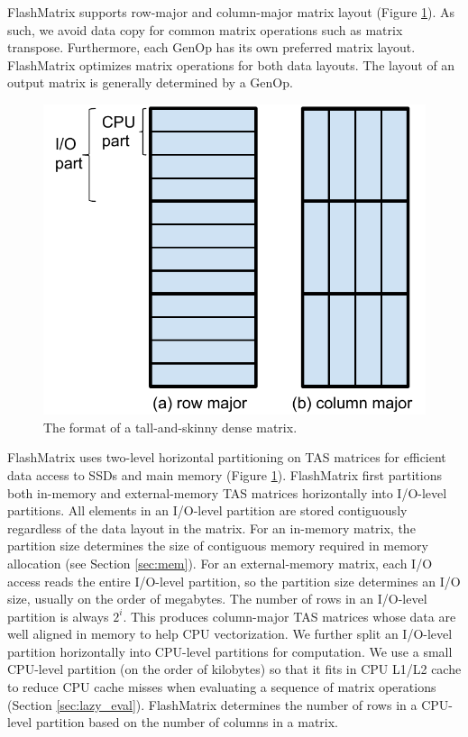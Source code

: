 FlashMatrix supports row-major and column-major matrix layout (Figure
\ref{fig:tas_mat}). As such,
we avoid data copy for common matrix operations such as matrix transpose.
Furthermore, each GenOp has its own preferred matrix layout. FlashMatrix
optimizes matrix operations for both data layouts. The layout of an output
matrix is generally determined by a GenOp.

\begin{figure}
	\centering
	\includegraphics[scale=0.5]{FlashMatrix_figs/dense_matrix.pdf}
	\caption{The format of a tall-and-skinny dense matrix.}
	\label{fig:tas_mat}
\end{figure}

FlashMatrix uses two-level horizontal partitioning on TAS matrices for efficient
data access to SSDs and main memory (Figure \ref{fig:tas_mat}). FlashMatrix
first partitions both in-memory and external-memory TAS matrices horizontally
into I/O-level partitions. All elements in an I/O-level partition are stored
contiguously regardless of the data layout in the matrix. For an in-memory matrix,
the partition size determines the size of contiguous memory required in memory
allocation (see Section \ref{sec:mem}). For an external-memory matrix, each I/O
access reads the entire I/O-level partition, so the partition size determines an I/O
size, usually on the order of megabytes. The number of rows in an I/O-level
partition is always $2^i$. This produces column-major TAS matrices whose data
are well aligned in memory to help CPU vectorization.
We further split an I/O-level partition
horizontally into CPU-level partitions for computation. We use a small
CPU-level partition (on the order of kilobytes) so that it fits in CPU L1/L2
cache to reduce CPU cache misses when evaluating a sequence of matrix
operations (Section \ref{sec:lazy_eval}). FlashMatrix determines the number
of rows in a CPU-level partition based on the number of columns in a matrix.

